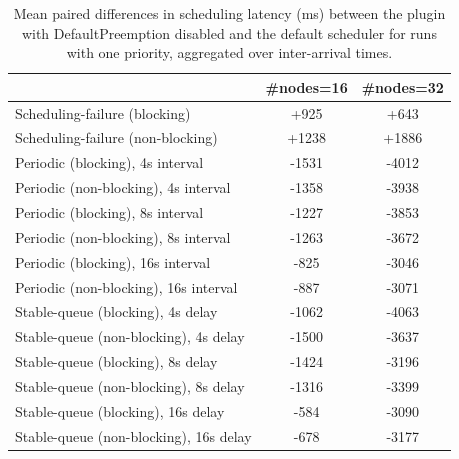\begin{table}[t]
\tiny
\setlength{\tabcolsep}{1.2pt}
\renewcommand{\arraystretch}{1.12}
\centering
\caption{Mean paired differences in scheduling latency (ms) between the plugin with DefaultPreemption disabled and the default scheduler for runs with one priority, aggregated over inter-arrival times.}
\label{tab:latency-defpreempt0-prio1-std0-agg-arrival}
\begin{tabular}{l c c}
\toprule
 & \#nodes=16 & \#nodes=32 \\
\midrule
Scheduling-failure (blocking) & +925 & +643 \\
Scheduling-failure (non-blocking) & +1238 & +1886 \\
Periodic (blocking), 4s interval & -1531 & -4012 \\
Periodic (non-blocking), 4s interval & -1358 & -3938 \\
Periodic (blocking), 8s interval & -1227 & -3853 \\
Periodic (non-blocking), 8s interval & -1263 & -3672 \\
Periodic (blocking), 16s interval & -825 & -3046 \\
Periodic (non-blocking), 16s interval & -887 & -3071 \\
Stable-queue (blocking), 4s delay & -1062 & -4063 \\
Stable-queue (non-blocking), 4s delay & -1500 & -3637 \\
Stable-queue (blocking), 8s delay & -1424 & -3196 \\
Stable-queue (non-blocking), 8s delay & -1316 & -3399 \\
Stable-queue (blocking), 16s delay & -584 & -3090 \\
Stable-queue (non-blocking), 16s delay & -678 & -3177 \\
\bottomrule
\end{tabular}
\end{table}
